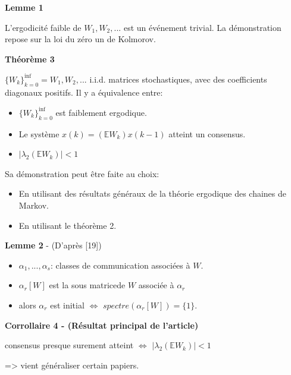 \documentclass{beamer}
\begin{document}
\begin{frame}
	\textbf{Lemme 1}
	
	L'ergodicité faible de $W_1, W_2, ... $ est un événement trivial.
	\bigbreak
	\pause
	La démonstration repose sur la loi du zéro un de Kolmorov.
	
	\pause
	\textbf{Théorème 3}
	\begin{center}
		$\{W_k\}_{k=0}^{\inf} = W_1, W_2, ...$ i.i.d. matrices stochastiques, 
		avec des coefficients diagonaux positifs.
		\pause
		Il y a équivalence entre:
		\begin{itemize}
			\item $\{W_k\}_{k=0}^{\inf}$ est faiblement ergodique.
			\pause
			\item Le système $x(k) = (\mathbb{E}W_k)x(k-1)$ atteint un consensus.
			\item $| \lambda_2(\mathbb{E}W_k)| < 1$
		\end{itemize}
	\end{center}
	\pause
	\bigbreak
	Sa démonstration peut être faite au choix:
	\begin{itemize}
		\item En utilisant des résultats généraux de la théorie ergodique des chaines de Markov.
		\item En utilisant le théorème 2.
	\end{itemize}
\end{frame}
\begin{frame}
	\textbf{Lemme 2} - (D'après [19])
	\begin{itemize}
		\item $\alpha_1, ..., \alpha_s$: classes de communication associées à $W$.
		\item $\alpha_r[W]$ est la sous matricede $W$ associée à $\alpha_r$
		\item alors $\alpha_r$ est initial $\iff$ $spectre(\alpha_r[W]) = \{1\}$.
	\end{itemize}
\end{frame}
\begin{frame}
	\textbf{Corrollaire 4 - (Résultat principal de l'article)}
	\begin{center}
		consensus presque surement atteint
		$\iff$
		$|\lambda_{2}(\mathbb{E}W_k)| < 1$
	\end{center}
	\pause
	\bigbreak
	=> vient généraliser certain papiers.
\end{frame}
\end{document}
